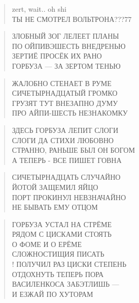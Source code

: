 \poemtitle{***}
\begin{verse}
zert, wait.. oh shi~\\
ТЫ НЕ СМОТРЕЛ ВОЛЬТРОНА???77
\end{verse}

\poemtitle{***}
\begin{verse}
ЗЛОБНЫЙ ЗОГ ЛЕЛЕЕТ ПЛАНЫ\\
ПО ОЙПИВЭШЕСТЬ ВНЕДРЕНЬЮ\\
ЗЕРТИЁ ПРОСЁК ИХ РАНО\\
ГОРБУЗА — ЗА ЗЕРТОМ ТЕНЬЮ
\end{verse}

\poemtitle{***}
\begin{verse}
ЖАЛОБНО СТЕНАЕТ В РУМЕ\\
СИЧЕТЫРНАДЦАТЫЙ ГРОМКО\\
ГРУЗЯТ ТУТ ВНЕЗАПНО ДУМУ\\
ПРО АЙПИ-ШЕСТЬ НЕЗНАКОМКУ
\end{verse}

\poemtitle{***}
\begin{verse}
ЗДЕСЬ ГОРБУЗА ЛЕПИТ СЛОГИ\\
СЛОГИ ДА СТИХИ ЛЮБОВНО\\
СТРАННО, РАНЬШЕ БЫЛ ОН БОГОМ\\
А ТЕПЕРЬ - ВСЕ ПИШЕТ ГОВНА
\end{verse}

\poemtitle{***}
\begin{verse}
СИЧЕТЫРНАДЦАТЬ СЛУЧАЙНО\\
ЙОТОЙ ЗАЩЕМИЛ ЯЙЦО\\
ПОРТ ПРОКИНУЛ НЕВЗНАЧАЙНО\\
НЕ БЫВАТЬ ЕМУ ОТЦОМ
\end{verse}

\poemtitle{***}
\begin{verse}
ГОРБУЗА УСТАЛ НА СТРЁМЕ\\
РЯДОМ С ЦИСКАМИ СТОЯТЬ\\
О ФОМЕ И О ЕРЁМЕ\\
СЛОЖНОСТИЩИЯ ПИСАТЬ\\!
ПОЛУЧИЛ РАЗ ЦИСКИ СТЕПЕНЬ\\
ОТДОХНУТЬ ТЕПЕРЬ ПОРА\\
ВАСИЛЕНКОСА ЗАБЭТЛИШЬ —\\
И ЕЗЖАЙ ПО ХУТОРАМ
\end{verse}

